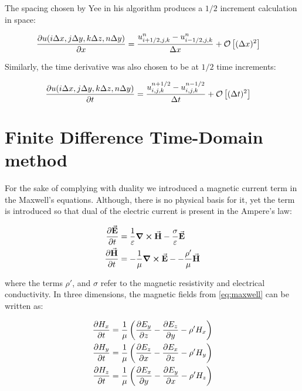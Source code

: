 \documentclass[11pt]{article}
\begin{document}
The spacing chosen by Yee in his algorithm produces a $1/2$ increment calculation in space:

\begin{align}
  \pdv{u (i \Delta x, j \Delta y, k \Delta z, n \Delta y )}{x} & = \frac{u^n_{i + 1/2, j , k} - u^n_{i - 1/2, j , k}}{\Delta x} + \mathcal{O}\left[(\Delta x)^2\right]
\end{align}

Similarly, the time derivative was also chosen to be at $1/2$ time increments:

\begin{align}
  \pdv{u (i \Delta x, j \Delta y, k \Delta z, n \Delta y )}{t} & = \frac{u^{n + 1/2}_{i , j , k} - u^{n - 1/2}_{i , j , k}}{\Delta t} + \mathcal{O}\left[(\Delta t)^2\right]
\end{align}

\section{Finite Difference Time-Domain method}

For the sake of complying with duality we introduced a magnetic current term in the Maxwell's equations. Although, there is no physical basis for it, yet the term is introduced so that dual of the electric current is present in the Ampere's law:

\begin{subequations}
  \begin{align}
    \pdv{\va{E}}{t} & = \frac{1}{\varepsilon} \curl{\va{H}} - \frac{\sigma}{\varepsilon}  \va{E} \label{eq:faradays}   \\
    \pdv{\va{H}}{t} & = -\frac{1}{\mu} \curl{\va{E}} - - \frac{\rho'}{\mu}  \va{H} \label{eq:ameperes}
  \end{align}
  \label{eq:maxwell}
\end{subequations}

where the terms $\rho'$, and $\sigma$ refer to the magnetic resistivity and electrical conductivity. In three dimensions, the magnetic fields from \eqref{eq:maxwell} can be written as:

\begin{subequations}
  \begin{align}
    \pdv{H_x}{t} & =\frac{1}{\mu}\left(\pdv{E_y}{z}-\pdv{E_z}{y}-\rho' H_{x}\right) \label{eq:H_x_3D} \\
    \pdv{H_y}{t} & =\frac{1}{\mu}\left(\pdv{E_z}{x}-\pdv{E_x}{z}-\rho' H_{y}\right) \label{eq:H_y_3D} \\
    \pdv{H_z}{t} & =\frac{1}{\mu}\left(\pdv{E_x}{y}-\pdv{E_y}{x}-\rho' H_{z}\right) \label{eq:H_z_3D}
  \end{align}
  \label{eq:magnetic}
\end{subequations}
\end{document}
